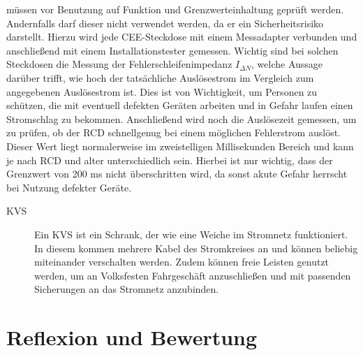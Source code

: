 müssen vor Benutzung auf Funktion und Grenzwerteinhaltung geprüft werden. Andernfalls darf dieser nicht verwendet werden, da er ein Sicherheitsrisiko 
darstellt. Hierzu wird jede CEE-Steckdose mit einem Messadapter verbunden und anschließend mit einem Installationstester gemessen. Wichtig sind bei 
solchen Steckdosen die Messung der Fehlerschleifenimpedanz $I_{ΔN}$, welche Aussage darüber trifft, wie hoch der tatsächliche Auslösestrom im Vergleich 
zum angegebenen Auslösestrom ist. Dies ist von Wichtigkeit, um Personen zu schützen, die mit eventuell defekten Geräten arbeiten und in Gefahr laufen 
einen Stromschlag zu bekommen. Anschließend wird noch die Auslösezeit gemessen, um zu prüfen, ob der RCD schnellgenug bei einem möglichen Fehlerstrom 
auslöst. Dieser Wert liegt normalerweise im zweistelligen Millisekunden Bereich und kann je nach RCD und alter unterschiedlich sein. Hierbei ist nur 
wichtig, dass der Grenzwert von 200 ms nicht überschritten wird, da sonst akute Gefahr herrscht bei Nutzung defekter Geräte. %
\begin{description}
\item[KVS] Ein KVS ist ein Schrank, der wie eine Weiche im Stromnetz funktioniert. In diesem kommen mehrere Kabel des Stromkreises an und können beliebig 
miteinander verschalten werden. Zudem können freie Leisten genutzt werden, um \zB an Volksfesten Fahrgeschäft anzuschließen und mit passenden Sicherungen 
an das Stromnetz anzubinden.
\end{description}

\section{Reflexion und Bewertung}

